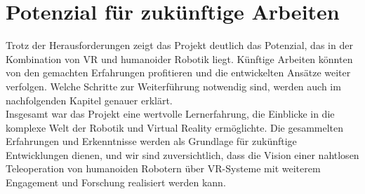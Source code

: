 \section{Potenzial für zukünftige Arbeiten}
Trotz der Herausforderungen zeigt das Projekt deutlich das Potenzial, das in der Kombination von VR und humanoider Robotik liegt. Künftige Arbeiten könnten von den gemachten Erfahrungen profitieren und die entwickelten Ansätze weiter verfolgen. Welche Schritte zur Weiterführung notwendig sind, werden auch im nachfolgenden Kapitel genauer erklärt.
\\

\noindent
Insgesamt war das Projekt eine wertvolle Lernerfahrung, die Einblicke in die komplexe Welt der Robotik und Virtual Reality ermöglichte. Die gesammelten Erfahrungen und Erkenntnisse werden als Grundlage für zukünftige Entwicklungen dienen, und wir sind zuversichtlich, dass die Vision einer nahtlosen Teleoperation von humanoiden Robotern über VR-Systeme mit weiterem Engagement und Forschung realisiert werden kann.
